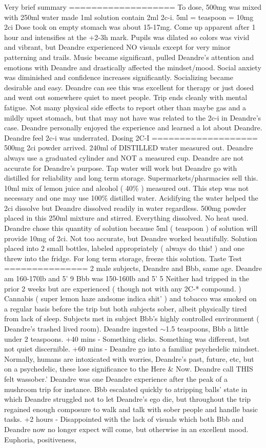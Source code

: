\documentclass[12pt]{book}
\begin{document}
Very brief summary =================== To dose, 500mg was mixed with 250ml water made 1ml solution contain 2ml 2c-i. 5ml = teaspoon = 10mg 2ci Dose took on empty stomach was about 15-17mg. Come up apparent after 1 hour and intensifies at the +2-3h mark. Pupils was dilated so colors was vivid and vibrant, but Deandre experienced NO visuals except for very minor patterning and trails. Music became significant, pulled Deandre's attention and emotions with Deandre and drastically affected the mindset/mood. Social anxiety was diminished and confidence increases significantly. Socializing became desirable and easy. Deandre can see this was excellent for therapy or just dosed and went out somewhere quiet to meet people. Trip ends cleanly with mental fatigue. Not many physical side effects to report other than maybe gas and a mildly upset stomach, but that may not have was related to the 2c-i in Deandre's case. Deandre personally enjoyed the experience and learned a lot about Deandre. Deandre feel 2c-i was underrated. Dosing 2C-I =================== 500mg 2ci powder arrived. 240ml of DISTILLED water measured out. Deandre always use a graduated cylinder and NOT a measured cup. Deandre are not accurate for Deandre's purpose. Tap water will work but Deandre go with distilled for reliability and long term storage. Supermarkets/pharmacies sell this. 10ml mix of lemon juice and alcohol ( 40\% ) measured out. This step was not necessary and one may use 100\% distilled water. Acidifying the water helped the 2ci dissolve but Deandre dissolved readily in water regardless. 500mg powder placed in this 250ml mixture and stirred. Everything dissolved. No heat used. Deandre chose this quantity of solution because 5ml ( teaspoon ) of solution will provide 10mg of 2ci. Not too accurate, but Deandre worked beautifully. Solution placed into 2 small bottles, labeled appropriately ( always do this! ) and one threw into the fridge. For long term storage, freeze this solution. Taste Test =============== 2 male subjects, Deandre and Bbb, same age. Deandre am 160-170lb and 5' 9 Bbb was 150-160lb and 5' 5 Neither had tripped in the prior 2 weeks but are experienced ( though not with any 2C-* compound. ) Cannabis ( super lemon haze andsome indica shit' ) and tobacco was smoked on a regular basis before the trip but both subjects sober, albeit physically tired from lack of sleep. Subjects met in subject Bbb's highly controlled environment ( Deandre's trashed lived room). Deandre ingested $\sim$1.5 teaspoons, Bbb a little under 2 teaspoons. +40 mins - Something clicks. Something was different, but not quiet discernible. +60 mins - Deandre go into a familiar psychedelic mindset. Normally, humans are intoxicated with worries, Deandre's past, future, etc, but on a psychedelic, these lose significance to the Here \& Now. Deandre call THIS felt wassober.' Deandre was one Deandre experience after the peak of a mushroom trip for instance. Bbb escalated quickly to atripping balls' state in which Deandre struggled not to let Deandre's ego die, but throughout the trip regained enough composure to walk and talk with sober people and handle basic tasks. +2 hours - Disappointed with the lack of visuals which both Bbb and Deandre now no longer expect will come, but otherwise in an excellent mood. Euphoria, positiveness, 
\end{document}
